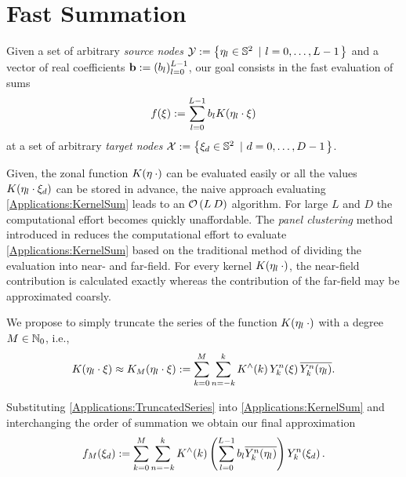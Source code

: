 \documentclass[11pt,a4paper,twoside,bibtotoc]{scrartcl}
\theoremstyle{plain}
\theoremstyle{definition}
\theoremstyle{remark}
\numberwithin{equation}{section}
\numberwithin{table}{section}
\numberwithin{figure}{section}
\begin{document}
\section{Fast Summation}
Given a set of arbitrary \emph{source nodes} $\mathcal{Y} :=
  \left\{\mathbf{\eta}_{l} \in \mathbb{S}^2\ \left|\ l = 0,\ldots,L-1\right.\right\rbrace$ and a vector of
  real coefficients $\mathbf{b}:=(b_{l})_{l=0}^{L-1}$, our goal consists in the fast
evaluation of sums 
\begin{equation}
  \label{Applications:KernelSum}
  f{\hspace{-0.4ex}}\left(\xi\right) := \sum_{l = 0}^{L-1} b_{l} K{\hspace{-0.4ex}}\left(\mathbf{\eta}_{l} \cdot \mathbf{\xi}\right)
\end{equation}
at a set of arbitrary \emph{target nodes} $\mathcal{X} := \left\{\mathbf{\xi}_{d}
  \in \mathbb{S}^2\ \left|\ d=0,\ldots,D-1\right.\right\rbrace$.

Given, the zonal function $K{\hspace{-0.4ex}}\left(\mathbf{\eta} \: \cdot\right)$ can be evaluated easily
or all the values $K{\hspace{-0.4ex}}\left(\mathbf{\eta}_{l} \cdot \mathbf{\xi}_{d}\right)$ can be stored in
advance, the naive approach evaluating \eqref{Applications:KernelSum} leads to
an $\mathcal{O}\left(L\:D\right)$ algorithm. 
For large $L$ and $D$ the computational effort becomes quickly unaffordable.
The \emph{panel clustering} method introduced in \cite{FrGlSch98} reduces the
computational effort to evaluate \eqref{Applications:KernelSum} based on the
traditional method of dividing the evaluation into near- and far-field.
For every kernel $K{\hspace{-0.4ex}}\left(\mathbf{\eta}_l \: \cdot\right)$, the near-field contribution
is calculated exactly whereas the contribution of the far-field may be
approximated coarsly.

We propose to simply truncate the series of the function
$K{\hspace{-0.4ex}}\left(\mathbf{\eta}_{l}\: \cdot\right)$ with a degree $M \in \mathbb{N}_{0}$, i.e.,
\begin{equation}
  \label{Applications:TruncatedSeries}
  K{\hspace{-0.4ex}}\left(\mathbf{\eta}_{l} \cdot \mathbf{\xi}\right) \approx K_{M}{\hspace{-0.4ex}}\left(\mathbf{\eta}_{l} \cdot
  \mathbf{\xi}\right) := \sum_{k=0}^{M} \sum_{n=-k}^k K^{\wedge}{\hspace{-0.4ex}}\left(k\right)
  Y_{k}^n{\hspace{-0.4ex}}\left(\mathbf{\xi}\right) \overline{Y_{k}^n{\hspace{-0.4ex}}\left(\mathbf{\eta}_{l}\right)}.
\end{equation}

Substituting \eqref{Applications:TruncatedSeries} into
\eqref{Applications:KernelSum} and interchanging the order of summation we
obtain our final approximation
\[
  f_{M}{\hspace{-0.4ex}}\left(\xi_{d}\right) := \sum_{k=0}^{M} \sum_{n=-k}^k K^{\wedge}{\hspace{-0.4ex}}\left(k\right)
  \left(\sum_{l = 0}^{L-1} b_{l} \overline{Y_{k}^n{\hspace{-0.4ex}}\left(\mathbf{\eta}_{l}\right)}\right)
  Y_{k}^n{\hspace{-0.4ex}}\left(\mathbf{\xi}_{d}\right).
\]
\end{document}
